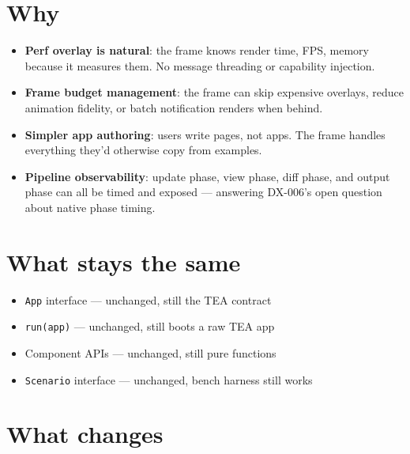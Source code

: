 

\section{Why}\label{record-372-why}

\begin{itemize}
\tightlist
\item
  \textbf{Perf overlay is natural}: the frame knows render time, FPS, memory because it measures them. No message threading or capability injection.
\item
  \textbf{Frame budget management}: the frame can skip expensive overlays, reduce animation fidelity, or batch notification renders when behind.
\item
  \textbf{Simpler app authoring}: users write pages, not apps. The frame handles everything they'd otherwise copy from examples.
\item
  \textbf{Pipeline observability}: update phase, view phase, diff phase, and output phase can all be timed and exposed --- answering DX-006's open question about native phase timing.
\end{itemize}

\section{What stays the same}\label{record-372-what-stays-the-same}

\begin{itemize}
\tightlist
\item
  \texttt{A\allowbreak{}p\allowbreak{}p} interface --- unchanged, still the TEA contract
\item
  \texttt{r\allowbreak{}u\allowbreak{}n\allowbreak{}(\allowbreak{}a\allowbreak{}p\allowbreak{}p\allowbreak{})} --- unchanged, still boots a raw TEA app
\item
  Component APIs --- unchanged, still pure functions
\item
  \texttt{S\allowbreak{}c\allowbreak{}e\allowbreak{}n\allowbreak{}a\allowbreak{}r\allowbreak{}i\allowbreak{}o} interface --- unchanged, bench harness still works
\end{itemize}

\section{What changes}\label{record-372-what-changes}

